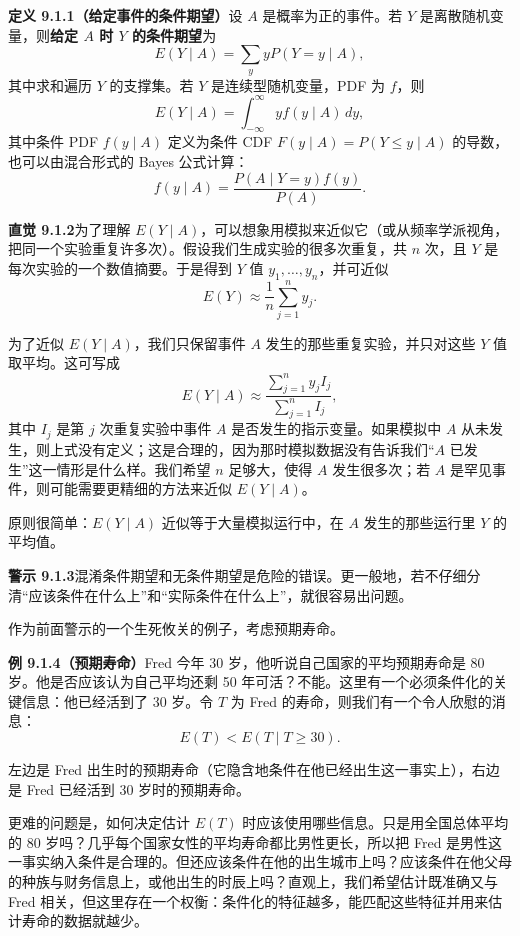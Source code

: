\documentclass[UTF8, 12pt, fontset=fandol, oneside]{ctexart}
\begin{document}
\noindent\textbf{定义 9.1.1（给定事件的条件期望）}\quad 设 $A$ 是概率为正的事件。若 $Y$ 是离散随机变量，则\textbf{给定 $A$ 时 $Y$ 的条件期望}为
\[
  E(Y\mid A)=\sum_y yP(Y=y\mid A),
\]
其中求和遍历 $Y$ 的支撑集。若 $Y$ 是连续型随机变量，PDF 为 $f$，则
\[
  E(Y\mid A)=\int_{-\infty}^{\infty} y f(y\mid A)\,dy,
\]
其中条件 PDF $f(y\mid A)$ 定义为条件 CDF $F(y\mid A)=P(Y\le y\mid A)$ 的导数，也可以由混合形式的 Bayes 公式计算：
\[
  f(y\mid A)=\frac{P(A\mid Y=y)f(y)}{P(A)}.
\]

\noindent\textbf{直觉 9.1.2}\quad 为了理解 $E(Y\mid A)$，可以想象用模拟来近似它（或从频率学派视角，把同一个实验重复许多次）。假设我们生成实验的很多次重复，共 $n$ 次，且 $Y$ 是每次实验的一个数值摘要。于是得到 $Y$ 值 $y_1,\ldots,y_n$，并可近似
\[
  E(Y)\approx \frac1n\sum_{j=1}^n y_j.
\]

为了近似 $E(Y\mid A)$，我们只保留事件 $A$ 发生的那些重复实验，并只对这些 $Y$ 值取平均。这可写成
\[
  E(Y\mid A)\approx
  \frac{\sum_{j=1}^n y_j I_j}{\sum_{j=1}^n I_j},
\]
其中 $I_j$ 是第 $j$ 次重复实验中事件 $A$ 是否发生的指示变量。如果模拟中 $A$ 从未发生，则上式没有定义；这是合理的，因为那时模拟数据没有告诉我们“$A$ 已发生”这一情形是什么样。我们希望 $n$ 足够大，使得 $A$ 发生很多次；若 $A$ 是罕见事件，则可能需要更精细的方法来近似 $E(Y\mid A)$。

原则很简单：$E(Y\mid A)$ 近似等于大量模拟运行中，在 $A$ 发生的那些运行里 $Y$ 的平均值。

\noindent\textbf{警示 9.1.3}\quad 混淆条件期望和无条件期望是危险的错误。更一般地，若不仔细分清“应该条件在什么上”和“实际条件在什么上”，就很容易出问题。

作为前面警示的一个生死攸关的例子，考虑预期寿命。

\noindent\textbf{例 9.1.4（预期寿命）}\quad Fred 今年 30 岁，他听说自己国家的平均预期寿命是 80 岁。他是否应该认为自己平均还剩 50 年可活？不能。这里有一个必须条件化的关键信息：他已经活到了 30 岁。令 $T$ 为 Fred 的寿命，则我们有一个令人欣慰的消息：
\[
  E(T)<E(T\mid T\ge 30).
\]

左边是 Fred 出生时的预期寿命（它隐含地条件在他已经出生这一事实上），右边是 Fred 已经活到 30 岁时的预期寿命。

更难的问题是，如何决定估计 $E(T)$ 时应该使用哪些信息。只是用全国总体平均的 80 岁吗？几乎每个国家女性的平均寿命都比男性更长，所以把 Fred 是男性这一事实纳入条件是合理的。但还应该条件在他的出生城市上吗？应该条件在他父母的种族与财务信息上，或他出生的时辰上吗？直观上，我们希望估计既准确又与 Fred 相关，但这里存在一个权衡：条件化的特征越多，能匹配这些特征并用来估计寿命的数据就越少。
\end{document}
